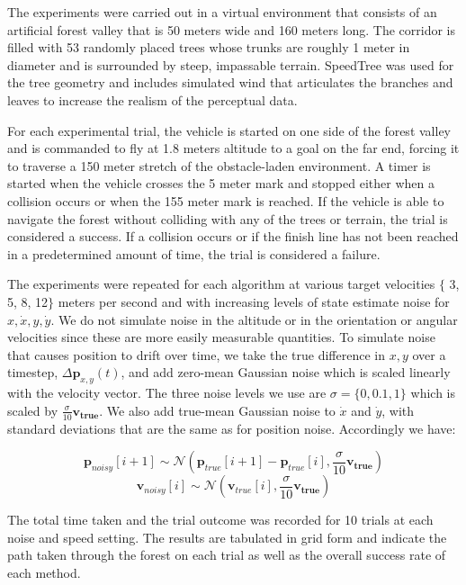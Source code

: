 \documentclass{llncs}
\begin{document}
The experiments were carried out in a virtual environment that consists of an artificial forest valley that is 50 meters wide and 160 meters long. The corridor is filled with 53 randomly placed trees whose trunks are roughly 1 meter in diameter and is surrounded by steep, impassable terrain.  SpeedTree was used for the tree geometry and includes simulated wind that articulates the branches and leaves to increase the realism of the perceptual data.

For each experimental trial, the vehicle is started on one side of the forest valley and is commanded to fly at 1.8 meters altitude to a goal on the far end, forcing it to traverse a 150 meter stretch of the obstacle-laden environment.  A timer is started when the vehicle crosses the 5 meter mark and stopped either when a collision occurs or when the 155 meter mark is reached.  If the vehicle is able to navigate the forest without colliding with any of the trees or terrain, the trial is considered a success.  If a collision occurs or if the finish line has not been reached in a predetermined amount of time, the trial is considered a failure.

The experiments were repeated for each algorithm at various target velocities $\{$ 3, 5, 8, 12$\}$ meters per second and with increasing levels of state estimate noise for $x, \dot{x}, y, \dot{y}$. We do not simulate noise in the altitude or in the orientation or angular velocities since these are more easily measurable quantities. To simulate noise that causes position to drift over time, we take the true difference in $x, y$ over a timestep, $\Delta \mathbf{p}_{x,y}(t)$, and add zero-mean Gaussian noise which is scaled linearly with the velocity vector.  The three noise levels we use are $\sigma = \{0, 0.1, 1\}$ which is scaled by $\frac{\sigma}{10}\mathbf{v_{true}}$.  We also add true-mean Gaussian noise to $\dot{x}$ and $\dot{y}$, with standard deviations that are the same as for position noise.  Accordingly we have:
%
\begin{center}
$$\mathbf{p}_{noisy}[i+1] \sim \mathcal{N}(\mathbf{p}_{true}[i+1] -\mathbf{p}_{true}[i] ,\frac{\sigma}{10}\mathbf{v_{true}})$$ 
$$\mathbf{v}_{noisy}[i] \sim \mathcal{N}(\mathbf{v}_{true}[i],\frac{\sigma}{10}\mathbf{v_{true}})$$
\end{center}
%
The total time taken and the trial outcome was recorded for 10 trials at each noise and speed setting.  The results are tabulated in grid form and indicate the path taken through the forest on each trial as well as the overall success rate of each method.
\end{document}
